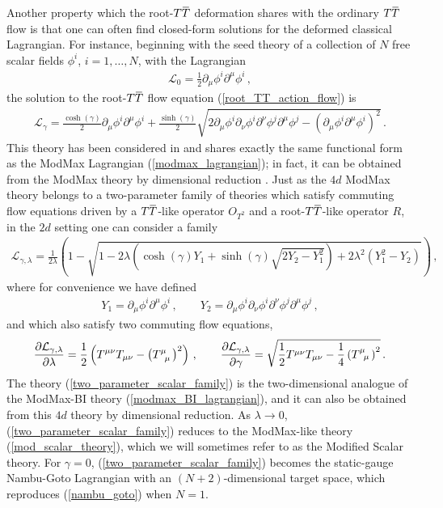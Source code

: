 \documentclass[12pt]{article}
\numberwithin{equation}{section}
\newcommand{\overbar}[1]{\mkern 1.5mu\overline{\mkern-1.5mu#1\mkern-1.5mu}\mkern 1.5mu}
\def\TT{{T\overbar{T}}}
\begin{document}
Another property which the root-$\TT$ deformation shares with the ordinary $\TT$ flow is that one can often find closed-form solutions for the deformed classical Lagrangian. For instance, beginning with the seed theory of a collection of $N$ free scalar fields $\phi^i$, $i = 1 , \ldots , N$, with the Lagrangian
%
\begin{align}
    \mathcal{L}_0 = \frac{1}{2} \partial_\mu \phi^i \partial^\mu \phi^i \, , 
\end{align}
%
the solution to the root-$\TT$ flow equation (\ref{root_TT_action_flow}) is
%
\begin{align}\label{mod_scalar_theory}
    \mathcal{L}_\gamma = \frac{\cosh ( \gamma )}{2} \partial_\mu \phi^i \partial^\mu \phi^i + \frac{\sinh ( \gamma )}{2} \sqrt{ 2 \partial_\mu \phi^i \partial_\nu \phi^i \partial^\nu \phi^j \partial^\mu \phi^j - \left( \partial_\mu \phi^i \partial^\mu \phi^i \right)^2 } \, .
\end{align}
%
This theory has been considered in \cite{Ferko:2022cix,Babaei-Aghbolagh:2022leo} and shares exactly the same functional form as the ModMax Lagrangian (\ref{modmax_lagrangian}); in fact, it can be obtained from the ModMax theory by dimensional reduction \cite{Conti:2022egv}. Just as the $4d$ ModMax theory belongs to a two-parameter family of theories which satisfy commuting flow equations driven by a $\TT$-like operator $O_{T^2}$ and a root-$\TT$-like operator $R$, in the $2d$ setting one can consider a family
%
\begin{align}\label{two_parameter_scalar_family}
    \mathcal{L}_{\gamma, \lambda} = \frac{1}{2 \lambda} \left( 1 - \sqrt{ 1 - 2 \lambda \left( \cosh ( \gamma ) Y_1 + \sinh ( \gamma ) \sqrt{ 2 Y_2 - Y_1^2 } \right) + 2 \lambda^2 \left( Y_1^2 - Y_2 \right) }  \right) \, , 
\end{align}
%
where for convenience we have defined
%
\begin{align}\label{intro_scalar_Xi}
    Y_1 = \partial_\mu \phi^i \partial^\mu \phi^i \, , \qquad Y_2 = \partial_\mu \phi^i \partial_\nu \phi^i \partial^\nu \phi^j \partial^\mu \phi^j \, ,
\end{align}
%
and which also satisfy two commuting flow equations,
%
\begin{align}\label{ModScalar_two_commuting_flows}
    \frac{\partial \mathcal{L}_{\gamma, \lambda}}{\partial \lambda} = \frac{1}{2} \left( T^{\mu \nu} T_{\mu \nu} - \left( \tensor{T}{^\mu_\mu} \right)^2 \right) \, , \qquad \frac{\partial \mathcal{L}_{\gamma, \lambda} }{\partial \gamma} = \sqrt{ \frac{1}{2}  T^{\mu \nu} T_{\mu \nu} - \frac{1}{4} \left( \tensor{T}{^\mu_\mu} \right)^2 } \, .
\end{align}
%
The theory (\ref{two_parameter_scalar_family}) is the two-dimensional analogue of the ModMax-BI theory (\ref{modmax_BI_lagrangian}), and it can also be obtained from this $4d$ theory by dimensional reduction. As $\lambda \to 0$, (\ref{two_parameter_scalar_family}) reduces to the ModMax-like theory (\ref{mod_scalar_theory}), which we will sometimes refer to as the Modified Scalar theory. For $\gamma = 0$, (\ref{two_parameter_scalar_family}) becomes the static-gauge Nambu-Goto Lagrangian with an $(N+2)$-dimensional target space, which reproduces (\ref{nambu_goto}) when $N = 1$.
\end{document}
